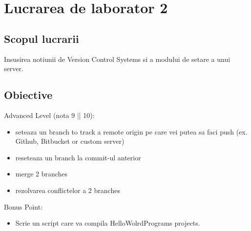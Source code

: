 \section{Lucrarea de laborator 2}

\subsection{Scopul lucrarii}

	Insusirea notiunii de Version Control Systems si a modului de setare a unui server.\
	
\subsection{Obiective}
Advanced Level (nota 9 || 10):
\begin{itemize}
		\item seteaza un branch to track a remote origin pe care vei putea sa faci push (ex. Github, Bitbucket or custom server)\
		\item reseteaza un branch la commit-ul anterior\
		\item merge 2 branches\
		\item rezolvarea conflictelor a 2 branches
\end{itemize}
Bonus Point:
\begin{itemize}
	\item Scrie un script care va compila HelloWolrdPrograms projects.\
\end{itemize}

	